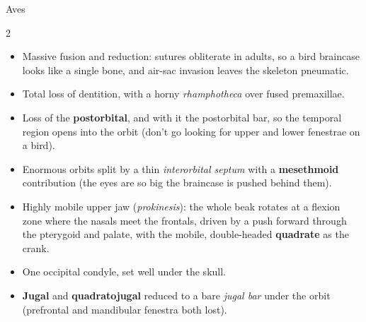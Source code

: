 \documentclass[11pt]{article}
\newcommand{\bone}[1]{\textbf{#1}}
\newcommand{\term}[1]{\textsl{#1}}
\begin{document}
\begin{cladebox}{Aves}
\begin{multicols}{2}
\begin{itemize}
\item Massive fusion and reduction: sutures obliterate in adults, so a bird
  braincase looks like a single bone, and air-sac invasion leaves the skeleton pneumatic.
\item Total loss of dentition, with a horny \term{rhamphotheca} over fused
  premaxillae.
\item Loss of the \bone{postorbital}, and with it the postorbital bar, so the temporal region opens into the orbit (don't go looking for upper and lower fenestrae on a bird).
\item Enormous orbits split by a thin \term{interorbital septum} with a
  \bone{mesethmoid} contribution (the eyes are so big the braincase is pushed
  behind them).
\item Highly mobile upper jaw (\term{prokinesis}): the whole beak rotates at a
  flexion zone where the nasals meet the frontals, driven by a push forward
  through the pterygoid and palate, with the mobile, double-headed
  \bone{quadrate} as the crank.
\item One occipital condyle, set well under the skull.
\item \bone{Jugal} and \bone{quadratojugal} reduced to a bare \term{jugal bar} under
  the orbit (prefrontal and mandibular fenestra both lost).
\end{itemize}
\end{multicols}
\end{cladebox}
\end{document}
